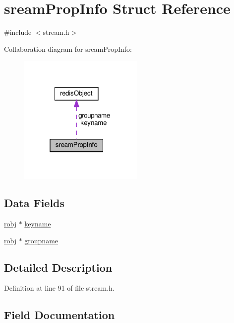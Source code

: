 \hypertarget{structsream_prop_info}{}\section{sream\+Prop\+Info Struct Reference}
\label{structsream_prop_info}


{\ttfamily \#include $<$stream.\+h$>$}



Collaboration diagram for sream\+Prop\+Info\+:
\nopagebreak
\begin{figure}[H]
\begin{center}
\leavevmode
\includegraphics[width=172pt]{structsream_prop_info__coll__graph}
\end{center}
\end{figure}
\subsection*{Data Fields}
\begin{DoxyCompactItemize}
\item 
\hyperlink{server_8h_a540f174d2685422fbd7d12e3cd44c8e2}{robj} $\ast$ \hyperlink{structsream_prop_info_a37c11de77e5a9c1cbb2db7966f6c4ddd}{keyname}
\item 
\hyperlink{server_8h_a540f174d2685422fbd7d12e3cd44c8e2}{robj} $\ast$ \hyperlink{structsream_prop_info_a8801876933504a596261b47afbc90505}{groupname}
\end{DoxyCompactItemize}


\subsection{Detailed Description}


Definition at line 91 of file stream.\+h.



\subsection{Field Documentation}
\mbox{\label{structsream_prop_info_a8801876933504a596261b47afbc90505}} 
